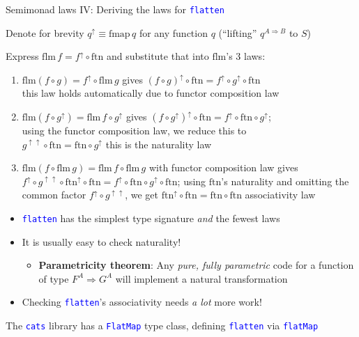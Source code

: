 \documentclass[english]{beamer}
\begin{document}
\begin{frame}{Semimonad laws IV: Deriving the laws for \texttt{\textcolor{blue}{\footnotesize{}flatten}} }

Denote for brevity $q^{\uparrow}\equiv\text{fmap}\,q$ for any function
$q$ (``lifting'' $q^{A\Rightarrow B}$ to $S$)

Express $\text{flm}\,f=f^{\uparrow}\circ\text{ftn}$ and substitute
that into $\text{flm}$'s 3 laws:
\begin{enumerate}
\item {\footnotesize{}$\text{flm}\left(f\circ g\right)=f^{\uparrow}\circ\text{flm}\,g$}
gives {\footnotesize{}$\left(f\circ g\right)^{\uparrow}\circ\text{ftn}=f^{\uparrow}\circ g^{\uparrow}\circ\text{ftn}$}\\
\textendash{} this law holds automatically due to functor composition
law
\item {\footnotesize{}$\text{flm}\left(f\circ g^{\uparrow}\right)=\text{flm}\,f\circ g^{\uparrow}$}
gives {\footnotesize{}$\left(f\circ g^{\uparrow}\right)^{\uparrow}\circ\text{ftn}=f^{\uparrow}\circ\text{ftn}\circ g^{\uparrow}$};\\
using the functor composition law, we reduce this to\\
{\footnotesize{}$g^{\uparrow\uparrow}\circ\text{ftn}=\text{ftn}\circ g^{\uparrow}$}
\textendash{} this is the naturality law
\item {\footnotesize{}$\text{flm}\left(f\circ\text{flm}\,g\right)=\text{flm}\,f\circ\text{flm}\,g$
}with functor composition law gives{\footnotesize{} $f^{\uparrow}\circ g^{\uparrow\uparrow}\circ\text{ftn}^{\uparrow}\circ\text{ftn}=f^{\uparrow}\circ\text{ftn}\circ g^{\uparrow}\circ\text{ftn}$;}
using {\footnotesize{}$\text{ftn}$}'s naturality and omitting the
common factor{\footnotesize{} $f^{\uparrow}\circ g^{\uparrow\uparrow}$},
we get{\footnotesize{} $\text{ftn}^{\uparrow}\circ\text{ftn}=\text{ftn}\circ\text{ftn}$}
\textendash{} associativity law
\end{enumerate}
\begin{itemize}
\item \texttt{\textcolor{blue}{\footnotesize{}flatten}} has the simplest
type signature \emph{and} the fewest laws
\item It is usually easy to check naturality!
\begin{itemize}
\item \textbf{Parametricity theorem}: Any \emph{pure, fully parametric}
code for a function of type $F^{A}\Rightarrow G^{A}$ will implement
a natural transformation
\end{itemize}
\item Checking \texttt{\textcolor{blue}{\footnotesize{}flatten}}'s associativity
needs \emph{a lot} more work!
\end{itemize}
The \texttt{\textcolor{blue}{\footnotesize{}cats}} library has a \texttt{\textcolor{blue}{\footnotesize{}FlatMap}}
type class, defining \texttt{\textcolor{blue}{\footnotesize{}flatten}}
via \texttt{\textcolor{blue}{\footnotesize{}flatMap}} 
\end{frame}
\end{document}
